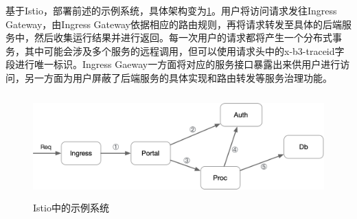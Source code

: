 \documentclass[12pt,a4paper]{article}
\theoremstyle{definition}
\begin{document}
基于Istio，部署前述的示例系统，具体架构变为\ref{fig:demo_arch_on_istio}。用户将访问请求发往Ingress Gateway，由Ingress Gateway依据相应的路由规则，再将请求转发至具体的后端服务中，然后收集运行结果并进行返回。每一次用户的请求都将产生一个分布式事务，其中可能会涉及多个服务的远程调用，但可以使用请求头中的x-b3-traceid字段进行唯一标识。Ingress Gaeway一方面将对应的服务接口暴露出来供用户进行访问，另一方面为用户屏蔽了后端服务的具体实现和路由转发等服务治理功能。

\begin{figure}[ht]
 \centering
 \includegraphics[height=4cm]{images/demo_arch_on_istio.png}
 \caption{Istio中的示例系统}
 \label{fig:demo_arch_on_istio}
\end{figure}
\end{document}
